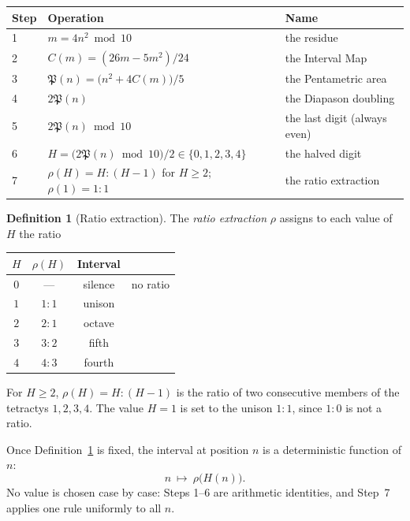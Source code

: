 \documentclass[11pt,a4paper]{article}
\newcommand{\Pent}{\mathfrak{P}}                      %
\theoremstyle{plain}
\theoremstyle{definition}
\newtheorem{definition}[theorem]{Definition}
\theoremstyle{remark}
\begin{document}
\begin{center}
\renewcommand{\arraystretch}{1.25}
\begin{tabular}{@{}lll@{}}
\toprule
Step & Operation & Name \\
\midrule
1 & $m=4n^{2}\bmod 10$ & the residue \\
2 & $C(m)=(26m-5m^{2})/24$ & the Interval Map \\
3 & $\Pent(n)=\bigl(n^{2}+4C(m)\bigr)/5$ & the Pentametric area \\
4 & $2\Pent(n)$ & the Diapason doubling \\
5 & $2\Pent(n)\bmod 10$ & the last digit (always even) \\
6 & $H=\bigl(2\Pent(n)\bmod 10\bigr)/2\in\{0,1,2,3,4\}$ & the halved digit \\
7 & $\rho(H)=H:(H-1)$ for $H\ge2$;\ \ $\rho(1)=1:1$ & the ratio extraction \\
\bottomrule
\end{tabular}
\end{center}

\begin{definition}[Ratio extraction]\label{def:ratio}
The \emph{ratio extraction} $\rho$ assigns to each value of $H$ the ratio
\begin{center}
\begin{tabular}{@{}cccl@{}}
\toprule
$H$ & $\rho(H)$ & Interval & \\
\midrule
$0$ & — & silence & no ratio \\
$1$ & $1:1$ & unison & \\
$2$ & $2:1$ & octave & \\
$3$ & $3:2$ & fifth & \\
$4$ & $4:3$ & fourth & \\
\bottomrule
\end{tabular}
\end{center}
For $H\ge2$, $\rho(H)=H:(H-1)$ is the ratio of two consecutive members of the tetractys $1,2,3,4$. The value $H=1$ is set to the unison $1:1$, since $1:0$ is not a ratio.
\end{definition}

Once Definition~\ref{def:ratio} is fixed, the interval at position $n$ is a deterministic function of $n$:
\[
  n\ \longmapsto\ \rho\bigl(H(n)\bigr).
\]
No value is chosen case by case: Steps 1–6 are arithmetic identities, and Step~7 applies one rule uniformly to all $n$.
\end{document}
